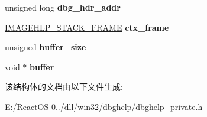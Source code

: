 \begin{DoxyCompactItemize}
unsigned long {\bfseries dbg\+\_\+hdr\+\_\+addr}
\item 
\mbox{\label{structprocess_a2ef006728ec017320f8cce4ffb87351b}} 
\hyperlink{struct___i_m_a_g_e_h_l_p___s_t_a_c_k___f_r_a_m_e}{I\+M\+A\+G\+E\+H\+L\+P\+\_\+\+S\+T\+A\+C\+K\+\_\+\+F\+R\+A\+ME} {\bfseries ctx\+\_\+frame}
\item 
\mbox{\label{structprocess_a7d783fee825fefe20379bb774f2abb3a}} 
unsigned {\bfseries buffer\+\_\+size}
\item 
\mbox{\label{structprocess_a6dcb134d6eb9877b0cb83b0f0170ffeb}} 
\hyperlink{interfacevoid}{void} $\ast$ {\bfseries buffer}
\end{DoxyCompactItemize}


该结构体的文档由以下文件生成\+:\begin{DoxyCompactItemize}
\item 
E\+:/\+React\+O\+S-\/0../dll/win32/dbghelp/dbghelp\+\_\+private.\+h\end{DoxyCompactItemize}
